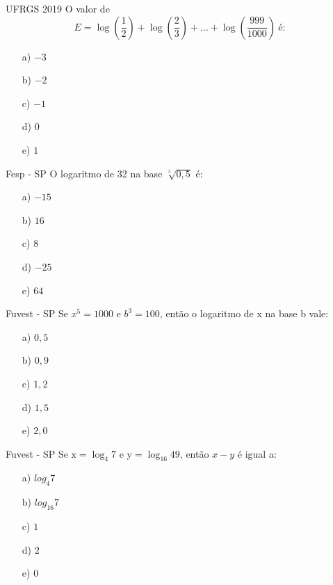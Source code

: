 \documentclass[12pt]{beamer}
\begin{document}
	\begin{frame}{UFRGS 2019}
		O valor de $$E=\log\left(\dfrac{1}{2} \right)+\log\left(\dfrac{2}{3} \right)+...+\log\left(\dfrac{999}{1000} \right) \ \textbf{é:} \ $$ 
		
		\begin{itemize}
			\item [a)] $-3$
			\item [b)] $-2$ %
			\item [c)] $-1$
			\item [d)] $0$
			\item [e)] $1$
		\end{itemize}
	\end{frame}
	
	\begin{frame}{Fesp - SP}
		O logaritmo de 32 na base $\sqrt[5]{0,5}$ é:
		
		\begin{itemize}
			\item [a)] $-15$
			\item [b)] $16$ 
			\item [c)] $8$
			\item [d)] $-25$ %
			\item [e)] $64$
		\end{itemize}
	\end{frame}
	
	\begin{frame}{Fuvest - SP}
		Se $x^{5}=1000$ e $b^{3}=100$, então o logaritmo de x na base b vale:
		
		\begin{itemize}
			\item [a)] $0,5$
			\item [b)] $0,9$ %
			\item [c)] $1,2$
			\item [d)] $1,5$ 
			\item [e)] $2,0$
		\end{itemize}
	\end{frame}
	
	\begin{frame}{Fuvest - SP}
		Se $\text{x}=\log_{4}7$ e $\text{y}=\log_{16}49$, então $x-y$ é igual a:
		
		\begin{itemize}
			\item [a)] $log_{4}7$
			\item [b)] $log_{16}7$
			\item [c)] $1$
			\item [d)] $2$
			\item [e)] $0$ %
		\end{itemize}
	\end{frame}
	
\end{document}
